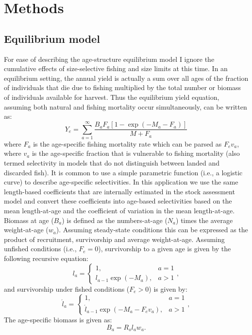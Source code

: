 \section*{Methods} %
\label{sec:methods}

\subsection*{Equilibrium model} %
\label{sub:equilibrium_model}

For ease of describing the age-structure equilibrium model I ignore the cumulative effects of size-selective fishing and size limits at this time. In an equilibrium setting, the annual yield is actually a sum over all ages of the fraction of individuals that die due to fishing multiplied by the total number or biomass of individuals available for harvest.  Thus the equilibrium yield equation, assuming both natural and fishing mortality occur simultaneously,  can be written as:
\begin{equation}\label{eq:Y_e}
	Y_e = \sum_{a=1}^\infty \frac{B_a F_a [1-\exp(-M_a-F_a)]}{M+F_a}
\end{equation}
where $F_a$ is the age-specific fishing mortality rate which can be parsed as $F_e v_a$, where $v_a$ is the age-specific fraction that is vulnerable to fishing mortality (also termed selectivity in models that do not distinguish between landed and discarded fish).  It is common to use a simple parametric function (i.e., a logistic curve) to describe age-specific selectivities.  In this application we use the same length-based coefficients that are internally estimated in the stock assessment model and convert these coefficients into age-based selectivities based on the mean length-at-age and the coefficient of variation in the mean length-at-age.  Biomass at age ($B_a$) is defined as the numbers-at-age ($N_a$) times the average weight-at-age ($w_a$).  Assuming steady-state conditions this can be expressed as the product of recruitment, survivorship and average weight-at-age.  Assuming unfished conditions (i.e., $F_e=0$), survivorship to a given age is given by the following recursive equation:
\begin{equation}\label{eq:unfished_survivorship}
	l_a =\begin{cases} 1, & a=1 \\ l_{a-1} \exp(-M_a), &a>1\end{cases}, 
\end{equation}
and survivorship under fished conditions ($F_e > 0$) is given by:
\begin{equation}\label{eq:fished_survivorship}
	\acute{l}_a =\begin{cases} 1, & a=1 \\ \acute{l}_{a-1} \exp(-M_a-F_e v_a), &a>1\end{cases}, 
\end{equation}
The age-specific biomass is given as:
\begin{equation} \label{eq:B_a}
	B_a = R_o l_a w_a.
\end{equation}

